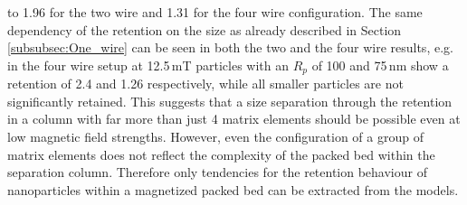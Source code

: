 to 1.96 for the two wire and 1.31 for the four wire configuration. The same dependency of the retention on the size as already described in Section \ref{subsubsec:One_wire} can be seen in both the two and the four wire results, e.g. in the four wire setup at 12.5\,mT particles with an $R_{p}$ of 100 and 75\,nm show a retention of 2.4 and 1.26 respectively, while all smaller particles are not significantly retained. This suggests that a size separation through the retention in a column with far more than just 4 matrix elements should be possible even at low magnetic field strengths. However, even the configuration of a group of matrix elements does not reflect the complexity of the packed bed within the separation column. Therefore only tendencies for the retention behaviour of nanoparticles within a magnetized packed bed can be extracted from the models.    


